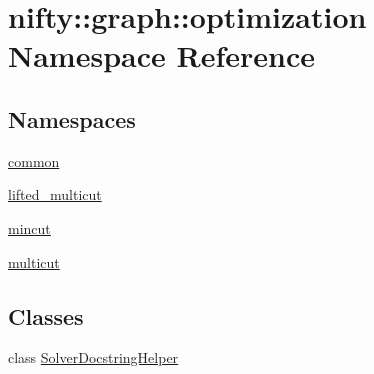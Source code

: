 \hypertarget{namespacenifty_1_1graph_1_1optimization}{}\section{nifty\+:\+:graph\+:\+:optimization Namespace Reference}
\label{namespacenifty_1_1graph_1_1optimization}
\subsection*{Namespaces}
\begin{DoxyCompactItemize}
\item 
 \hyperlink{namespacenifty_1_1graph_1_1optimization_1_1common}{common}
\item 
 \hyperlink{namespacenifty_1_1graph_1_1optimization_1_1lifted__multicut}{lifted\+\_\+multicut}
\item 
 \hyperlink{namespacenifty_1_1graph_1_1optimization_1_1mincut}{mincut}
\item 
 \hyperlink{namespacenifty_1_1graph_1_1optimization_1_1multicut}{multicut}
\end{DoxyCompactItemize}
\subsection*{Classes}
\begin{DoxyCompactItemize}
\item 
class \hyperlink{classnifty_1_1graph_1_1optimization_1_1SolverDocstringHelper}{Solver\+Docstring\+Helper}
\end{DoxyCompactItemize}
